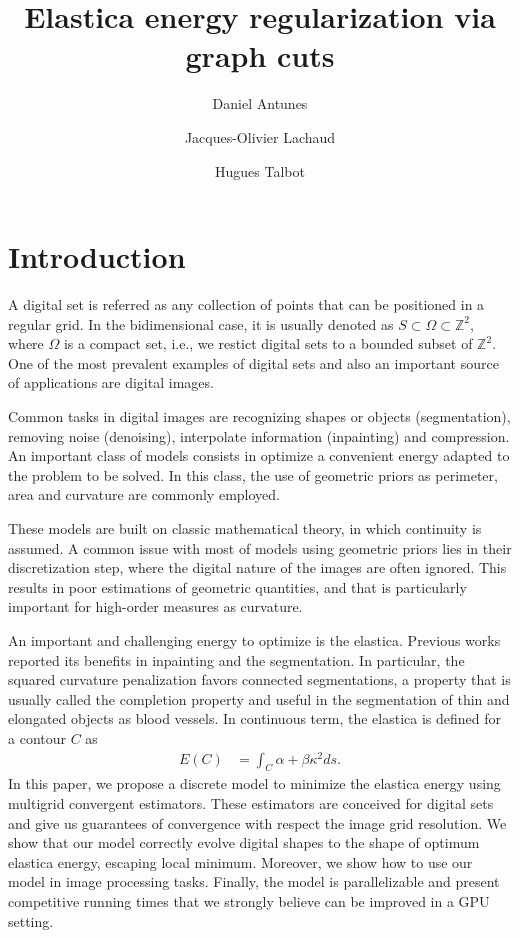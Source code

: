 \documentclass[smallextended]{svjour3}
\begin{document}
%
\title{Elastica energy regularization via graph cuts}
\author{Daniel Antunes%
\and Jacques-Olivier Lachaud %
\and Hugues Talbot}%

\maketitle

\section{Introduction}

A digital set is referred as any collection of points that can be positioned in a regular grid. In the bidimensional case, it is usually denoted as $S \subset \Omega \subset \mathbb{Z}^2$, where $\Omega$ is a compact set, i.e., we restict digital sets to a bounded subset of $\mathbb{Z}^2$. One of the most prevalent examples of digital sets and also an important source of applications are digital images.

Common tasks in digital images are recognizing shapes or objects (segmentation), removing noise (denoising), interpolate information (inpainting) and compression. An important class of models consists in optimize a convenient energy adapted to the problem to be solved. In this class, the use of geometric priors as perimeter, area and curvature are commonly employed.

These models are built on classic mathematical theory, in which continuity is assumed. A common issue with most of models using geometric priors lies in their discretization step, where the digital nature of the images are often ignored. This results in poor estimations of geometric quantities, and that is particularly important for high-order measures as curvature.

An important and challenging energy to optimize is the elastica. Previous works reported its benefits in inpainting and the segmentation. In particular, the squared curvature penalization favors connected segmentations, a property that is usually called the completion property and useful in the segmentation of thin and elongated objects as blood vessels. In continuous term, the elastica is defined for a contour $C$ as
%
\begin{align*}
	E(C) &= \int_{C}{\alpha + \beta \kappa^2 ds}.
\end{align*}
%
In this paper, we propose a discrete model to minimize the elastica energy using multigrid convergent estimators. These estimators are conceived for digital sets and give us guarantees of convergence with respect the image grid resolution. We show that our model correctly evolve digital shapes to the shape of optimum elastica energy, escaping local minimum. Moreover, we show how to use our model in image processing tasks. Finally, the model is parallelizable and present competitive running times that we strongly believe can be improved in a GPU setting.
\end{document}
